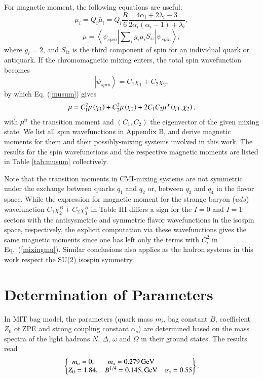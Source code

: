 \documentclass[prt,twocolumn,floatfix,nofootinbib]{revtex4}
\begin{document}
For magnetic moment, the following equations \cite{DeGrand:1975cf,Wang:2016dzu} are useful:
\begin{equation}\label{mui}
    \mu_{i}=Q_{i}\bar{\mu}_{i}=Q_{i}\frac{R}{6} \frac{4\alpha_{i}+2\lambda_{i}-3}{2\alpha_{i}\left(\alpha_{i}-1\right)+\lambda_{i}},
\end{equation}
\begin{equation}\label{musum}
    \mu=\left\langle \psi_{spin} \left| \sum\nolimits_{i}g_{i}\mu_{i}S_{iz} \right| \psi_{spin} \right\rangle,
\end{equation}
where $g_{i}=2$, and $S_{iz}$ is the third component of spin for an individual quark or antiquark.
If the chromomagnetic mixing enters, the total spin wavefunction becomes
\begin{equation}
    \left| \psi_{spin} \right\rangle=C_{1}\chi_{1}+C_{2}\chi_{2},
\end{equation}
by which Eq. (\ref{musum}) gives
\begin{equation}\label{mixingmu}
    \mu=C_{1}^{2}\mu\left(\chi_{1}\right)+C_{2}^{2}\mu\left(\chi_{2}\right)+2C_{1}C_{2}\mu^{\rm tr}\left(\chi_{1}, \chi_{2}\right),
\end{equation}
with $\mu^{\rm tr}$ the transition moment \cite{Bernotas:2012nz} and $(C_{1}, C_{2})$ the eigenvector of the given mixing state.
We list all spin wavefunctions in Appendix B, and derive magnetic moments for them and their possibly-mixing systems involved in this work. The results for the spin wavefunctions and the respective magnetic moments are listed in Table \ref{tab:musum} collectively.

Note that the transition moments in CMI-mixing systems are not symmetric under the exchange between quarks $q_{1}$ and $q_{2}$ or, between $q_{3}$ and $q_{4}$ in the flavor space. While the expression for magnetic moment for the strange baryon ($uds$) wavefunction $C_{1}\chi_{2}^{B}+C_{2}\chi_{3}^{B}$ in Table III differs a sign for the $I=0$ and $I=1$ sectors with the antisysmetric and symmetric flavor wavefunctions in the isospin space, respectively, the explicit computation via these wavefunctions gives the same magnetic moments since one has left only the terms with $C_{i}^{2}$ in Eq.~(\ref{mixingmu}). Similar conclusions also applies as the hadron systems in this work respect the SU(2) isospin symmetry.


\section{Determination of Parameters}\label{Parameters}
In MIT bag model, the parameters (quark mass $m_{i}$, bag constant $B$, coefficient $Z_{0}$ of ZPE and strong coupling constant $\alpha_{s}$) are determined based on the mass spectra of the light hadrons $N$, $\Delta$, $\omega$ and $\Omega$ in their ground states.
The results read \cite{DeGrand:1975cf}
\begin{equation}\label{originalparas}
    \begin{Bmatrix}
        m_{n}=0, & m_{s}=0.279\,{\rm GeV} \\
        Z_{0}=1.84, & B^{1/4}=0.145, {\rm GeV} & \alpha_{s}=0.55
    \end{Bmatrix}.
\end{equation}
\end{document}
